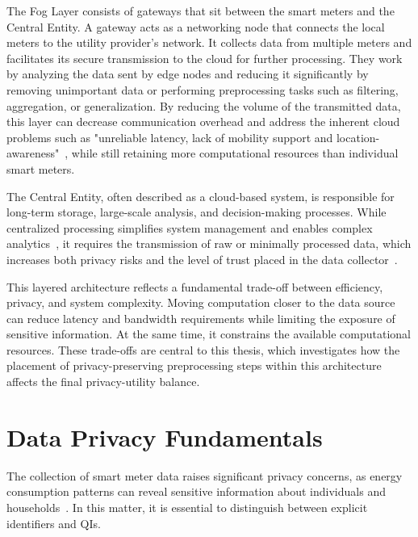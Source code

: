 The Fog Layer consists of gateways that sit between the smart meters and the Central Entity. A gateway acts as a networking node that connects the local meters to the utility provider's network. It collects data from multiple meters and facilitates its secure transmission to the cloud for further processing. They work by analyzing the data sent by edge nodes and reducing it significantly by removing unimportant data or performing preprocessing tasks such as filtering, aggregation, or generalization. By reducing the volume of the transmitted data, this layer can decrease communication overhead and address the inherent cloud problems such as "unreliable latency, lack of mobility support and location-awareness"~\cite{fogcomputing}, while still retaining more computational resources than individual smart meters.

The Central Entity, often described as a cloud-based system, is responsible for long-term storage, large-scale analysis, and decision-making processes. While centralized processing simplifies system management and enables complex analytics~\cite{SmartMetersApplications}, it requires the transmission of raw or minimally processed data, which increases both privacy risks and the level of trust placed in the data collector~\cite{InferringPersonalInformationFromDRS}.

This layered architecture reflects a fundamental trade-off between efficiency, privacy, and system complexity. Moving computation closer to the data source can reduce latency and bandwidth requirements while limiting the exposure of sensitive information. At the same time, it constrains the available computational resources. These trade-offs are central to this thesis, which investigates how the placement of privacy-preserving preprocessing steps within this architecture affects the final privacy-utility balance. 


\section{Data Privacy Fundamentals}

The collection of smart meter data raises significant privacy concerns, as energy consumption patterns can reveal sensitive information about individuals and households~\cite{InferringPersonalInformationFromDRS}. In this matter, it is essential to distinguish between explicit identifiers and \acp{QI}. 

